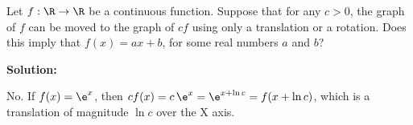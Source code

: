 \documentclass[../../main.tex]{subfiles}
\begin{document}
  \begin{shaded}
    Let $f: \R \to \R$ be a continuous function. Suppose that for any $c > 0$, the graph of $f$ can be moved to the graph of $c f$ using only a translation or a rotation. Does this imply that $f(x) = a x + b$, for some real numbers $a$ and $b$?
  \end{shaded}

  \textbf{Solution:}

  No. If $f(x) = \e^x$, then $c f(x) = c \, \e^x = \e^{x + \ln{c}} = f(x + \ln{c})$, which is a translation of magnitude $\ln{c}$ over the X axis.
\end{document}
